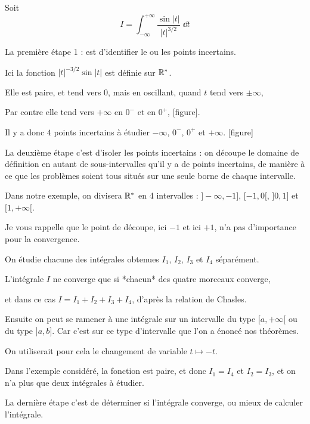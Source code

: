 Soit
$$I = \int_{-\infty}^{+\infty} \frac{\sin |t|}{|t|^{3/2}}\;\dd t$$  


\change

La première étape 1 : est d'identifier le ou les points incertains.

\change
Ici la fonction $|t|^{-3/2}\sin |t|$ est définie sur $\mathbb{R}^*$.

\change
Elle est paire, et tend vers $0$, mais en oscillant, quand $t$ tend vers $\pm \infty$, 

\change
Par contre elle tend vers $+\infty$ en $0^-$ et en $0^+$, 
[figure]. 

\change
Il y a donc $4$ points incertains à étudier 
$-\infty$, $0^-$, $0^+$ et $+\infty$.  [figure]



\diapo

La deuxième étape c'est d'isoler les points incertains :
on découpe le domaine de définition en autant de
sous-intervalles qu'il y a de points incertains, de manière à ce
que les problèmes soient tous situés sur une seule borne de chaque
intervalle.

\change
Dans notre exemple, on divisera $\mathbb{R}^*$ en 4 intervalles : 
$]-\infty,-1]$, $[-1,0[$, $]0,1]$ et $[1,+\infty[$.  

Je vous rappelle que le point de découpe, ici $-1$ et ici $+1$, n'a pas d'importance
pour la convergence.

\change
On étudie chacune des intégrales obtenues  $I_1$, $I_2$, $I_3$ et $I_4$  
séparément. 

\change
L'intégrale $I$ ne converge que si *chacun* des quatre morceaux converge, 

\change
et dans ce cas $I=I_1+I_2+I_3+I_4$, d'après la relation de Chasles.


\change
Ensuite on peut se ramener à une intégrale sur un intervalle du type 
$[a,+\infty[$ ou du type $]a,b]$.
Car c'est sur ce type d'intervalle que l'on a énoncé nos théorèmes.

\change
On utiliserait pour cela  le changement de variable 
$t\mapsto -t$. 

\change
Dans l'exemple considéré, la fonction est paire, et donc
$I_1=I_4$ et $I_2=I_3$, et on n'a plus que deux intégrales à étudier.

  


\diapo

La dernière étape c'est de déterminer si l'intégrale converge,
ou mieux de calculer l'intégrale.


